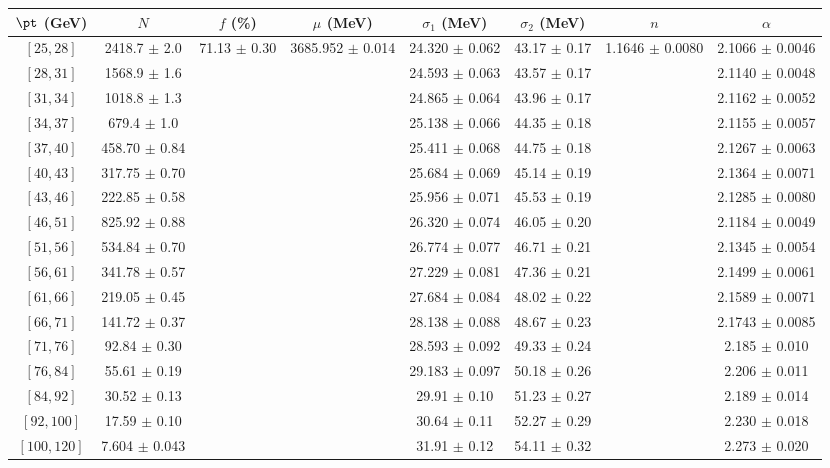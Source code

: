 \begin{tabular}{c||c|c|c|c|c|c|c}
$\pt$ (GeV) & $N$ & $f$ (\%) & $\mu$ (MeV) & $\sigma_1$ (MeV) & $\sigma_2$ (MeV) & $n$ & $\alpha$ \\
\hline
$[25, 28]$ & 2418.7 $\pm$ 2.0 & \multirow{17}{*}{71.13 $\pm$ 0.30} & \multirow{17}{*}{3685.952 $\pm$ 0.014} & 24.320 $\pm$ 0.062 & 43.17 $\pm$ 0.17 & \multirow{17}{*}{1.1646 $\pm$ 0.0080} & 2.1066 $\pm$ 0.0046\\
$[28, 31]$ & 1568.9 $\pm$ 1.6 &  &  & 24.593 $\pm$ 0.063 & 43.57 $\pm$ 0.17 &  & 2.1140 $\pm$ 0.0048\\
$[31, 34]$ & 1018.8 $\pm$ 1.3 &  &  & 24.865 $\pm$ 0.064 & 43.96 $\pm$ 0.17 &  & 2.1162 $\pm$ 0.0052\\
$[34, 37]$ & 679.4 $\pm$ 1.0 &  &  & 25.138 $\pm$ 0.066 & 44.35 $\pm$ 0.18 &  & 2.1155 $\pm$ 0.0057\\
$[37, 40]$ & 458.70 $\pm$ 0.84 &  &  & 25.411 $\pm$ 0.068 & 44.75 $\pm$ 0.18 &  & 2.1267 $\pm$ 0.0063\\
$[40, 43]$ & 317.75 $\pm$ 0.70 &  &  & 25.684 $\pm$ 0.069 & 45.14 $\pm$ 0.19 &  & 2.1364 $\pm$ 0.0071\\
$[43, 46]$ & 222.85 $\pm$ 0.58 &  &  & 25.956 $\pm$ 0.071 & 45.53 $\pm$ 0.19 &  & 2.1285 $\pm$ 0.0080\\
$[46, 51]$ & 825.92 $\pm$ 0.88 &  &  & 26.320 $\pm$ 0.074 & 46.05 $\pm$ 0.20 &  & 2.1184 $\pm$ 0.0049\\
$[51, 56]$ & 534.84 $\pm$ 0.70 &  &  & 26.774 $\pm$ 0.077 & 46.71 $\pm$ 0.21 &  & 2.1345 $\pm$ 0.0054\\
$[56, 61]$ & 341.78 $\pm$ 0.57 &  &  & 27.229 $\pm$ 0.081 & 47.36 $\pm$ 0.21 &  & 2.1499 $\pm$ 0.0061\\
$[61, 66]$ & 219.05 $\pm$ 0.45 &  &  & 27.684 $\pm$ 0.084 & 48.02 $\pm$ 0.22 &  & 2.1589 $\pm$ 0.0071\\
$[66, 71]$ & 141.72 $\pm$ 0.37 &  &  & 28.138 $\pm$ 0.088 & 48.67 $\pm$ 0.23 &  & 2.1743 $\pm$ 0.0085\\
$[71, 76]$ & 92.84 $\pm$ 0.30 &  &  & 28.593 $\pm$ 0.092 & 49.33 $\pm$ 0.24 &  & 2.185 $\pm$ 0.010\\
$[76, 84]$ & 55.61 $\pm$ 0.19 &  &  & 29.183 $\pm$ 0.097 & 50.18 $\pm$ 0.26 &  & 2.206 $\pm$ 0.011\\
$[84, 92]$ & 30.52 $\pm$ 0.13 &  &  & 29.91 $\pm$ 0.10 & 51.23 $\pm$ 0.27 &  & 2.189 $\pm$ 0.014\\
$[92, 100]$ & 17.59 $\pm$ 0.10 &  &  & 30.64 $\pm$ 0.11 & 52.27 $\pm$ 0.29 &  & 2.230 $\pm$ 0.018\\
$[100, 120]$ & 7.604 $\pm$ 0.043 &  &  & 31.91 $\pm$ 0.12 & 54.11 $\pm$ 0.32 &  & 2.273 $\pm$ 0.020\\
\end{tabular}
